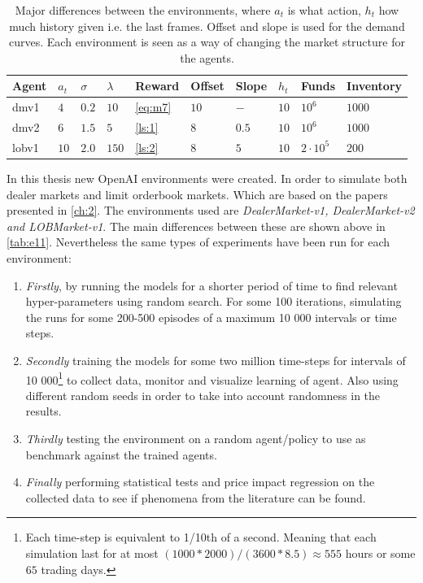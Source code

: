 \documentclass{kththesis}
\theoremstyle{definition}
\begin{document}
\begin{table}[H]
\centering
\caption{Major differences between the environments, where $a_t$ is what action, $h_t$ how much history given i.e. the last frames. Offset and slope is used for the demand curves. Each environment is seen as a way of changing the market structure for the agents.}
\label{tab:e11}
\begin{tabular}{llllllllll}
Agent & $a_t$  & $\sigma$  & $\lambda$  & Reward  & Offset  & Slope  & $h_t$  & Funds & Inventory  \\ \hline
 dmv1 & $4$  & $0.2$  & $10$  & \autoref{eq:m7}  & $10$  & $-$  &  $10$ & $10^6$ & $1000$ \\
 dmv2 & $6$  & $1.5$  & $5$  & \autoref{ls:1}  & $8$  & $0.5$  & $10$  & $10^6$ & $1000$ \\
 lobv1& $10$ & $2.0$  & $150$  & \autoref{ls:2} & $8$  & $5$  & $10$  & $2\cdot 10^5$ & $200$
\end{tabular}
\end{table}

In this thesis new OpenAI environments were created. In order to simulate both dealer markets and limit orderbook markets. Which are based on the papers presented in \autoref{ch:2}. 
\newline
\newline
The environments used are \textit{ DealerMarket-v1, DealerMarket-v2 and LOBMarket-v1}. The main differences between these are shown above in \autoref{tab:e11}.
Nevertheless the same types of experiments have been run for each environment:

\begin{enumerate}
    \item \textit{Firstly}, by running the models for a shorter period of time to find relevant hyper-parameters using random search. For some 100 iterations, simulating the runs for some 200-500 episodes of a maximum 10 000 intervals or time steps.
    
    \item \textit{Secondly} training the models for some two million time-steps for intervals of 10 000\footnote{Each time-step is equivalent to 1/10th of a second. Meaning that each simulation last for at most $ (1000*2000)/(3600 * 8.5) \approx 555$ hours or some $65$ trading days.} to collect data, monitor and visualize learning of agent. Also using different random seeds in order to take into account randomness in the results. 
    
    \item\textit{Thirdly} testing the environment on a random agent/policy to use as benchmark against the trained agents.
    
    \item   \textit{Finally} performing statistical tests and price impact regression on the collected data to see if phenomena from the literature can be found.
\end{enumerate}
\end{document}
